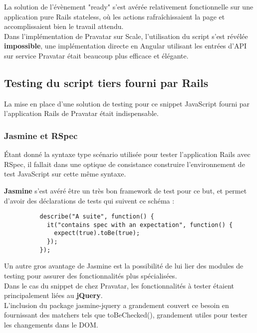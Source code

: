 \documentclass{report}
\begin{document}
          La solution de l'évènement "ready" s'est avérée relativement fonctionnelle sur une application pure Rails stateless, où les actions rafraîchissaient
          la page et accomplissaient bien le travail attendu.\\

          Dans l'implémentation de Pravatar sur Scale, l'utilisation du script s'est révélée \textbf{impossible}, une implémentation directe en Angular utilisant les
          entrées d'API sur service Pravatar était beaucoup plus efficace et élégante.\\

      \subsection{Testing du script tiers fourni par Rails}
      \label{sub:Testing du script tiers fournit par Rails}

        La mise en place d'une solution de testing pour ce snippet JavaScript fourni par l'application Rails de Pravatar était indispensable.\\

        \subsubsection{Jasmine et RSpec}
        \label{subs:Jasmine et RSpec}

          Étant donné la syntaxe type scénario utilisée pour tester l'application Rails avec RSpec, il fallait dans une optique de consistance construire l'environnement de test JavaScript sur cette même syntaxe.

          \textbf{Jasmine} s'est avéré être un très bon framework de test pour ce but, et permet d'avoir des déclarations de tests qui suivent ce schéma :\\

          \begin{lstlisting}
          describe("A suite", function() {
            it("contains spec with an expectation", function() {
              expect(true).toBe(true);
            });
          });
          \end{lstlisting}

          Un autre gros avantage de Jasmine est la possibilité de lui lier des modules de testing pour assurer des fonctionnalités plus spécialisées.\\
          Dans le cas du snippet de chez Pravatar, les fonctionnalités à tester étaient principalement liées au \textbf{jQuery}.\\
          L'inclusion du package jasmine-jquery a grandement couvert ce besoin en fournissant des matchers tels que toBeChecked(), grandement utiles pour tester les changements dans le DOM.\\
\end{document}
